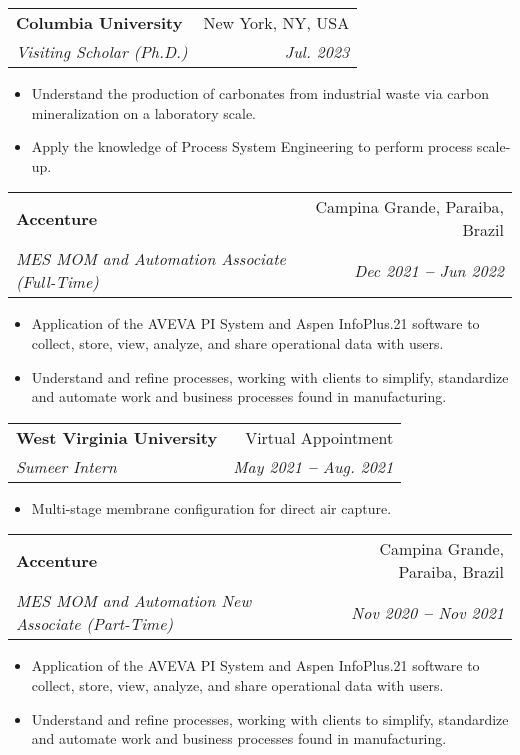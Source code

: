 \documentclass[letterpaper,11pt]{article}
\makeatletter
\newcommand{\resumeItem}[1]{
  \item\small{
    {#1 \vspace{-2pt}}
  }
}
\newcommand{\resumeSubheading}[4]{
  \vspace{-2pt}\item
    \begin{tabular*}{0.97\textwidth}[t]{l@{\extracolsep{\fill}}r}
      \textbf{#1} & #2 \\
      \textit{\small#3} & \textit{\small #4} \\
    \end{tabular*}\vspace{-7pt}
}
\newcommand{\resumeItemListStart}{\begin{itemize}}
\newcommand{\resumeItemListEnd}{\end{itemize}\vspace{-5pt}}
\makeatother
\begin{document}
    \resumeSubheading
      {Columbia University}{New York, NY, USA}
      {Visiting Scholar (Ph.D.)}{Jul. 2023 }
        \resumeItemListStart
            \resumeItem{Understand the production of carbonates from industrial waste via carbon mineralization on a laboratory scale.}
            \resumeItem{Apply the knowledge of Process System Engineering to perform process scale-up.}
        \resumeItemListEnd




    
 

    \resumeSubheading
      {Accenture}{Campina Grande, Paraiba, Brazil}
      {MES MOM and Automation Associate (Full-Time)}{Dec 2021 \textbf{--} Jun 2022}
        \resumeItemListStart
            \resumeItem{Application of the AVEVA PI System and Aspen InfoPlus.21 software to collect, store, view, analyze, and share operational data with users.}
            \resumeItem{Understand and refine processes, working with clients to simplify, standardize and automate work and business processes found in manufacturing.}
          \resumeItemListEnd

    \resumeSubheading
    {West Virginia University}{Virtual Appointment}
    {Sumeer Intern}{May 2021 \textbf{--} Aug. 2021}
      \resumeItemListStart
          \resumeItem{Multi-stage membrane configuration for direct air capture.}
      \resumeItemListEnd   

    \resumeSubheading
    {Accenture}{Campina Grande, Paraiba, Brazil}
    {MES MOM and Automation New Associate (Part-Time)}{Nov 2020 \textbf{--} Nov 2021}
      \resumeItemListStart
          \resumeItem{Application of the AVEVA PI System and Aspen InfoPlus.21 software to collect, store, view, analyze, and share operational data with users.}
          \resumeItem{Understand and refine processes, working with clients to simplify, standardize and automate work and business processes found in manufacturing.}
        \resumeItemListEnd
\end{document}
